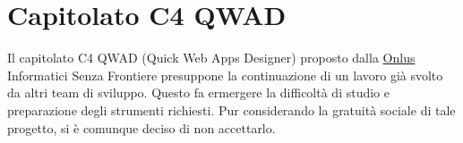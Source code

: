 \chapter{Capitolato C4 QWAD}
\thispagestyle{fancy}
Il capitolato C4 QWAD (Quick Web Apps Designer) proposto dalla \underline{Onlus}
Informatici Senza Frontiere presuppone la continuazione di un lavoro gi\`a svolto da altri
team di sviluppo. Questo fa ermergere la difficolt\`a di studio e preparazione degli strumenti richiesti. Pur considerando la gratuit\`a sociale di tale progetto, si \`e comunque deciso di non accettarlo.

